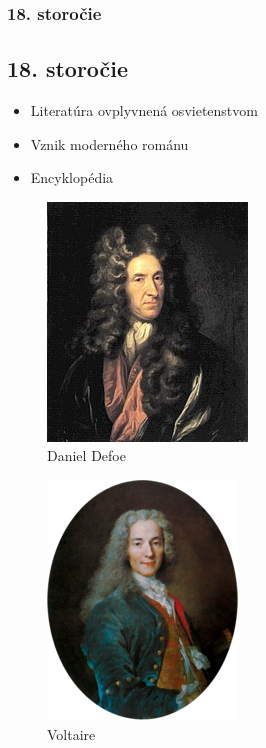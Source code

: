 \documentclass[dvipsnames]{beamer}
\begin{document}
\begin{frame}

	\frametitle{18. storočie}
	\subsection{18. storočie}
	\begin{itemize}
		\item Literatúra ovplyvnená osvietenstvom
		\item Vznik moderného románu
		\item Encyklopédia
	\end{itemize}
	\begin{minipage}[t]{0.5\textwidth}
		\kern0pt
		\begin{figure}
			\includegraphics[scale=0.4]{defoe}
			\caption{Daniel Defoe}
		\end{figure}
	\end{minipage}%
	\begin{minipage}[t]{0.5\textwidth}
		\kern0pt
		\begin{figure}
			\includegraphics[scale=0.4]{voltik}
			\caption{Voltaire}
		\end{figure}
	\end{minipage}


\end{frame}
\end{document}
